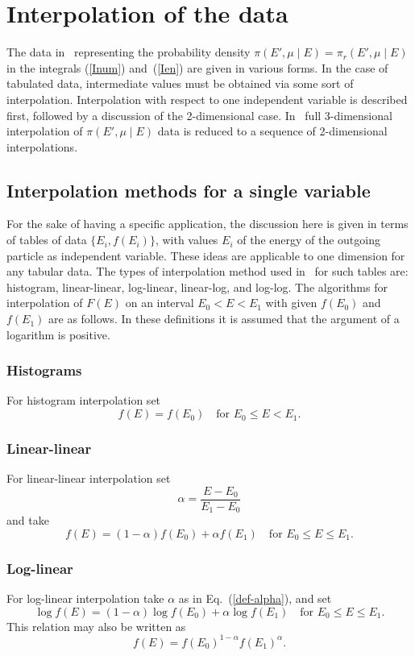 \chapter{Interpolation of the data}
\label{Sec:interpolate}
The data in \xendl\ representing the probability density
$\pi(E', \mu \mid E ) = \pi_r(E', \mu \mid E )$ in the integrals (\ref{Inum}) and~(\ref{Ien})
are given in various forms.  In the case of tabulated data, intermediate
values must be obtained via some sort of interpolation.  Interpolation
with respect to one independent variable is described first, followed by a discussion of
the 2-dimensional case.  In \xendl\ full 3-dimensional interpolation
of $\pi(E', \mu \mid E )$ data is reduced to a sequence of 2-dimensional
interpolations.

\section{Interpolation methods for a single variable}\label{Sec:1d-interp}
For the sake of having a specific application,
the discussion here is given in terms of tables of data $\{E_i, f(E_i)\}$,
with values $E_i$ of the energy of the outgoing particle as independent variable.
These ideas are applicable to one dimension for any tabular data.
The types of interpolation method used in \xendl\ 
for such tables are: histogram, linear-linear, 
log-linear, linear-log, and log-log.  The algorithms for interpolation
of $F(E)$ on an interval $E_0 < E < E_1$ with given $f(E_0)$ and~$f(E_1)$
are as follows.  In these definitions it is assumed that the argument of a
logarithm is positive.

\subsection{Histograms}
For histogram interpolation set
$$
  f(E) = f(E_0) \quad \text{for $E_0 \le E < E_1$}.
$$

\subsection{Linear-linear}
 For linear-linear interpolation set
\begin{equation}
   \alpha = \frac{E - E_0}{E_1 - E_0}
 \label{def-alpha}
\end{equation}
and take
$$
  f(E) = (1 - \alpha)f(E_0) + \alpha f(E_1)
   \quad \text{for $E_0 \le E \le E_1$}.
$$

\subsection{Log-linear}
For log-linear interpolation take $\alpha$ as in Eq.~(\ref{def-alpha}),
and set
$$
 \log f(E) = (1 - \alpha)\log f(E_0) + \alpha \log f(E_1)
   \quad \text{for $E_0 \le E \le E_1$}.
$$
This relation may also be written as
\begin{equation}
  f(E) = f(E_0)^{1 - \alpha} f(E_1)^\alpha.
 \label{loglin-interp}
\end{equation}

